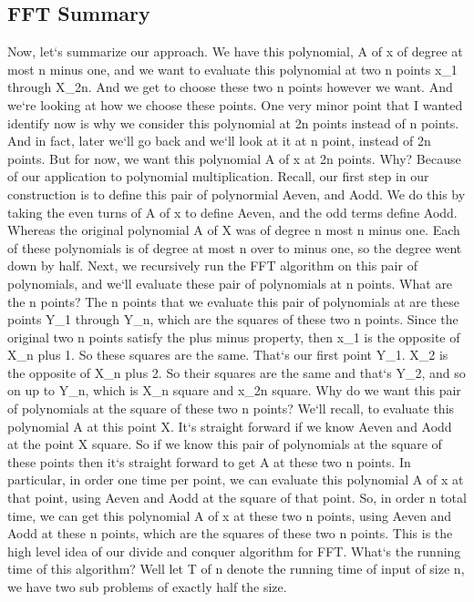 \subsection{FFT  Summary}
Now, let`s summarize our approach.
We have this polynomial, A of x of degree at most n minus one, and we want to evaluate this polynomial at two n points x\_1 through X\_2n.
And we get to choose these two n points however we want.
And we`re looking at how we choose these points.
One very minor point that I wanted identify now is why we consider this polynomial at 2n points instead of n points.
And in fact, later we`ll go back and we`ll look at it at n point, instead of 2n points.
But for now, we want this polynomial A of x at 2n points.
Why? Because of our application to polynomial multiplication.
Recall, our first step in our construction is to define this pair of polynormial Aeven, and Aodd.
We do this by taking the even turns of A of x to define Aeven, and the odd terms define Aodd.
Whereas the original polynomial A of X was of degree n most n minus one.
Each of these polynomials is of degree at most n over to minus one, so the degree went down by half.
Next, we recursively run the FFT algorithm on this pair of polynomials, and we`ll evaluate these pair of polynomials at n points.
What are the n points? The n points that we evaluate this pair of polynomials at are these points Y\_1 through Y\_n, which are the squares of these two n points.
Since the original two n points satisfy the plus minus property, then x\_1 is the opposite of X\_n plus 1.
So these squares are the same.
That`s our first point Y\_1.
X\_2 is the opposite of X\_n plus 2.
So their squares are the same and that`s Y\_2, and so on up to Y\_n, which is X\_n square and x\_2n square.
Why do we want this pair of polynomials at the square of these two n points? We`ll recall, to evaluate this polynomial A at this point X\@.
It`s straight forward if we know Aeven and Aodd at the point X square.
So if we know this pair of polynomials at the square of these points then it`s straight forward to get A at these two n points.
In particular, in order one time per point, we can evaluate this polynomial A of x at that point, using Aeven and Aodd at the square of that point.
So, in order n total time, we can get this polynomial A of x at these two n points, using Aeven and Aodd at these n points, which are the squares of these two n points.
This is the high level idea of our divide and conquer algorithm for FFT\@.
What`s the running time of this algorithm? Well let T of n denote the running time of input of size n, we have two sub problems of exactly half the size.
